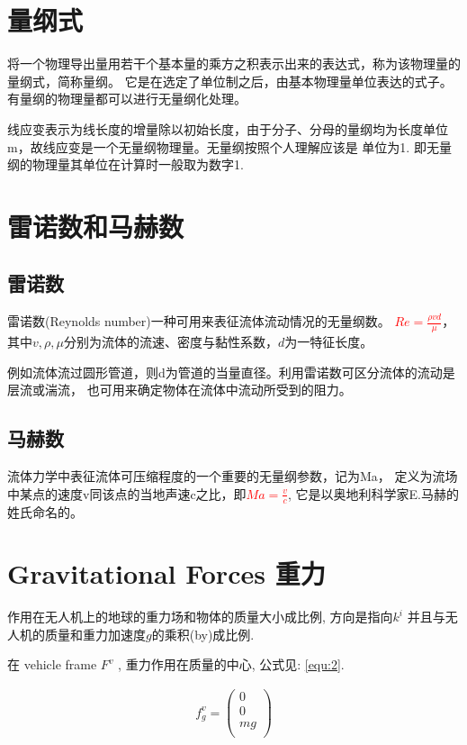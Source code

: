 \documentclass[UTF8,a4paper,10pt,nocolorlinks]{ctexart}
\begin{document}
    \section{量纲式}
    将一个物理导出量用若干个基本量的乘方之积表示出来的表达式，称为该物理量的量纲式，简称量纲。 
    它是在选定了单位制之后，由基本物理量单位表达的式子。
    有量纲的物理量都可以进行无量纲化处理。

    线应变表示为线长度的增量除以初始长度，由于分子、分母的量纲均为长度单位m，故线应变是一个无量纲物理量。无量纲按照个人理解应该是 单位为1. 
    即无量纲的物理量其单位在计算时一般取为数字1.
    \section{雷诺数和马赫数}
    \subsection{雷诺数}
    雷诺数(Reynolds number)一种可用来表征流体流动情况的无量纲数。
    \textcolor{red}{$Re = \frac{\rho vd}{\mu}$}，其中$v, \rho, \mu$分别为流体的流速、密度与黏性系数，$d$为一特征长度。
    \par 例如流体流过圆形管道，则d为管道的当量直径。利用雷诺数可区分流体的流动是层流或湍流，
    也可用来确定物体在流体中流动所受到的阻力。

    \subsection{马赫数}
    流体力学中表征流体可压缩程度的一个重要的无量纲参数，记为Ma，
    定义为流场中某点的速度v同该点的当地声速c之比，即\textcolor{red}{$Ma= \frac{v}{c}$}, 它是以奥地利科学家E.马赫的姓氏命名的。

    \section{Gravitational Forces 重力}
    作用在无人机上的地球的重力场和物体的质量大小成比例, 方向是指向$k^{i}$ 并且与无人机的质量和重力加速度$g$的乘积(by)成比例. \par
    在 vehicle frame $F^{v}$ , 重力作用在质量的中心, 公式见: \ref{equ:2}.

    
    \begin{gather} %
      f_{g}^{v} = \begin{pmatrix} 
        0 \\
        0 \\
        mg \\
      \end{pmatrix}
      \label{equ:2}
    \end{gather}
\end{document}
